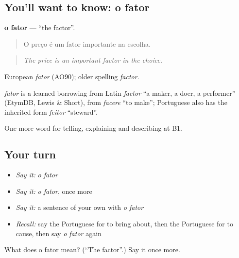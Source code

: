 \subsection*{You'll want to know: o fator}
\textbf{o fator} — \textquotedblleft{}the factor\textquotedblright{}.

\begin{quote}
O preço é um fator importante na escolha.
\end{quote}

\begin{quote}
\emph{The price is an important factor in the choice.}
\end{quote}

European \emph{fator} (AO90); older spelling \emph{factor}.

\begin{cousinweb}
\emph{fator} is a learned borrowing from Latin \emph{factor} \textquotedblleft{}a maker, a doer, a performer\textquotedblright{} (EtymDB, Lewis \& Short), from \emph{facere} \textquotedblleft{}to make\textquotedblright{}; Portuguese also has the inherited form \emph{feitor} \textquotedblleft{}steward\textquotedblright{}.
\end{cousinweb}

\begin{grammarlens}[title={What you've built}]
One more word for telling, explaining and describing at B1.
\end{grammarlens}

\subsection*{Your turn}
\begin{itemize}
\raggedright
  \item \emph{Say it:} \emph{o fator}
  \item \emph{Say it:} \emph{o fator}, once more
  \item \emph{Say it:} a sentence of your own with \emph{o fator}
  \item \emph{Recall:} say the Portuguese for to bring about, then the Portuguese for to cause, then say \emph{o fator} again
\end{itemize}

\begin{tcolorbox}[breakable,colback=teal!4,colframe=teal!35!black,title={Before you move on}]
What does o fator mean? (\textquotedblleft{}The factor\textquotedblright{}.) Say it once more.
\end{tcolorbox}
